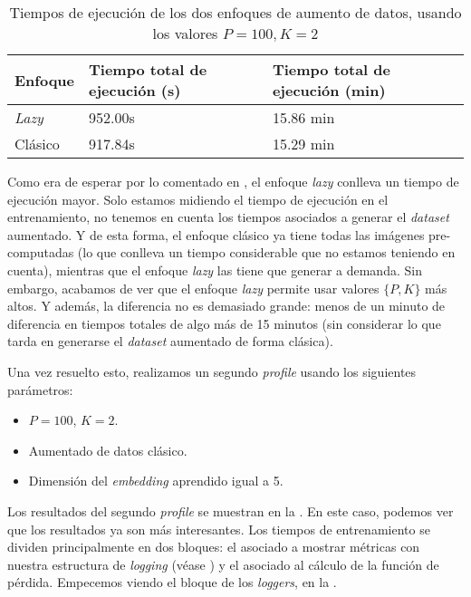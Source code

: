 \begin{table}[!hbtp]
	\centering
	\begin{tabular}{|l|l|l|}
		\hline
		\textbf{Enfoque} & \textbf{Tiempo total de ejecución (s)} & \textbf{Tiempo total de ejecución (min)} \\
		\hline

		\textit{Lazy}    & 952.00s                                & 15.86 min                                \\
		Clásico          & 917.84s                                & 15.29 min                                \\

		\hline
	\end{tabular}
	\caption{Tiempos de ejecución de los dos enfoques de aumento de datos, usando los valores $P = 100, K = 2$}
	\label{table:optimizacion_01}
\end{table}

Como era de esperar por lo comentado en , el enfoque \textit{lazy} conlleva un tiempo de ejecución mayor. Solo estamos midiendo el tiempo de ejecución en el entrenamiento, no tenemos en cuenta los tiempos asociados a generar el \textit{dataset} aumentado. Y de esta forma, el enfoque clásico ya tiene todas las imágenes pre-computadas (lo que conlleva un tiempo considerable que no estamos teniendo en cuenta), mientras que el enfoque \textit{lazy} las tiene que generar a demanda. Sin embargo, acabamos de ver que el enfoque \textit{lazy} permite usar valores $\{P, K\}$ más altos. Y además, la diferencia no es demasiado grande: menos de un minuto de diferencia en tiempos totales de algo más de 15 minutos (sin considerar lo que tarda en generarse el \textit{dataset} aumentado de forma clásica).

Una vez resuelto esto, realizamos un segundo \textit{profile} usando los siguientes parámetros:

\begin{itemize}
	\item $P = 100$, $K = 2$.
	\item Aumentado de datos clásico.
	\item Dimensión del \textit{embedding} aprendido igual a 5.
\end{itemize}

Los resultados del segundo \textit{profile} se muestran en la . En este caso, podemos ver que los resultados ya son más interesantes. Los tiempos de entrenamiento se dividen principalmente en dos bloques: el asociado a mostrar métricas con nuestra estructura de \textit{logging} (véase ) y el asociado al cálculo de la función de pérdida. Empecemos viendo el bloque de los \textit{loggers}, en la .

